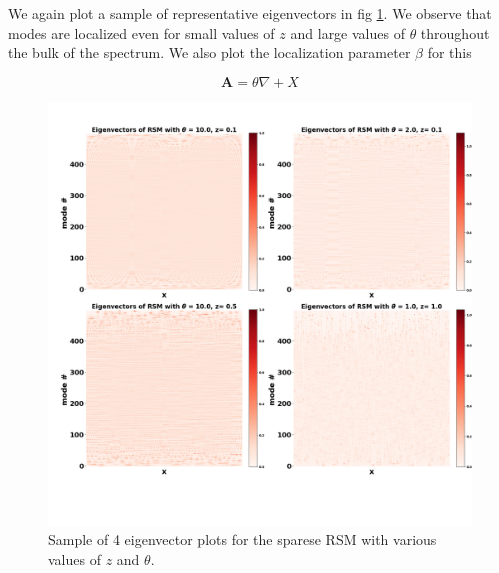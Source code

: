 \documentclass{article}
\begin{document}
We again plot a sample of representative eigenvectors in fig \ref{fig:sparse_springs_example}.
We observe that modes are localized even for small values of $z$ and large values of $\theta$ throughout the bulk of the spectrum.
We also plot the localization parameter $\beta$ for this

\begin{equation}\label{eq:random_sparse}
	\boldsymbol{A} = \theta \nabla + X
\end{equation}

\begin{figure}
\begin{center}
	\includegraphics[width=\textwidth]{Figures/sparse_eigenvectors.png}
\end{center}
\caption{Sample of 4 eigenvector plots for the sparese RSM with various values of $z$ and $\theta$. }
\label{fig:sparse_springs_example}
\end{figure}
\end{document}
